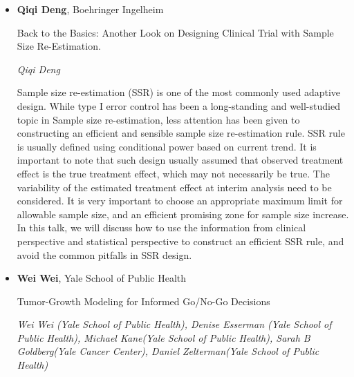 \begin{itemize}
\item \textbf{Qiqi Deng}, Boehringer Ingelheim

Back to the Basics: Another Look on Designing Clinical Trial with Sample Size Re-Estimation.

\emph{\footnotesize Qiqi Deng}

Sample size re-estimation (SSR) is one of the most commonly used adaptive design. While type I error control has been a long-standing and well-studied topic in Sample size re-estimation, less attention has been given to constructing an efficient and sensible sample size re-estimation rule. SSR rule is usually defined using conditional power based on current trend. It is important to note that such design usually assumed that observed treatment effect is the true treatment effect, which may not necessarily be true. The variability of the estimated treatment effect at interim analysis need to be considered. It is very important to choose an appropriate maximum limit for allowable sample size, and an efficient promising zone for sample size increase. In this talk, we will discuss how to use the information from clinical perspective and statistical perspective to construct an efficient SSR rule, and avoid the common pitfalls in SSR design.


\item \textbf{Wei Wei}, Yale School of Public Health

Tumor-Growth Modeling for Informed Go/No-Go Decisions

\emph{\footnotesize Wei Wei (Yale School of Public Health), Denise Esserman (Yale School of Public Health), Michael Kane(Yale School of Public Health), Sarah B Goldberg(Yale Cancer Center), Daniel Zelterman(Yale School of Public Health)}


\end{itemize}
